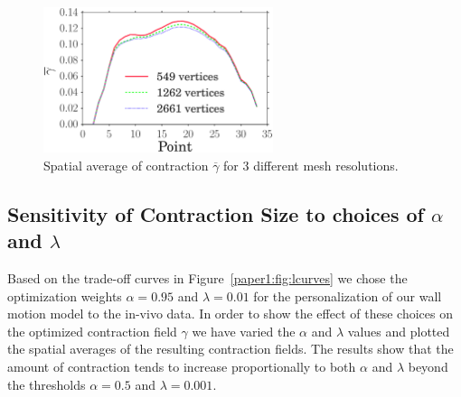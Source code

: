 \begin{figure}[]
\includegraphics[width=0.6\textwidth]{mesh_conv_gamma}
\caption{Spatial average of contraction $\overline{\gamma}$ for 3 different mesh
  resolutions.}
\label{paper1:fig:mesh_conv_gamma}
\end{figure}


\subsection{Sensitivity of Contraction Size to choices of $\alpha$ and $\lambda$}
\label{paper1:sec:sense_alpha_lambda}
Based on the trade-off curves in Figure~\ref{paper1:fig:lcurves} we chose 
the optimization weights $\alpha = 0.95$ and $\lambda = 0.01$ for the personalization
of our wall motion model to the in-vivo data. In order to show the effect of these 
choices on the optimized contraction field $\gamma$ we have varied
the $\alpha$ and $\lambda$ values and plotted the spatial averages of the resulting
contraction fields. The results show that the amount of contraction tends to increase
proportionally to both $\alpha$ and $\lambda$ beyond the thresholds $\alpha = 0.5$ and
$\lambda = 0.001$. 

